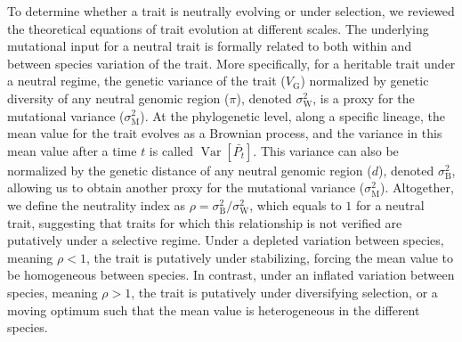 \documentclass{article}
\DeclareMathOperator{\Var}{\text{Var}}
\newcommand{\Time}{t}
\newcommand{\Trait}{P}
\newcommand{\MeanTrait}{\bar{\Trait_{\Time}}}
\newcommand{\VarPhy}{\Var \left[\MeanTrait\right]}
\newcommand{\VarGenetic}{V_{\mathrm{G}}}
\newcommand{\RateMut}{\sigma^2_{\mathrm{M}}}
\newcommand{\RatePhy}{\sigma^2_{\mathrm{B}}}
\newcommand{\RatePop}{\sigma^2_{\mathrm{W}}}
\newcommand{\NI}{\rho}
\begin{document}
To determine whether a trait is neutrally evolving or under selection, we reviewed the theoretical equations of trait evolution at different scales.
The underlying mutational input for a neutral trait is formally related to both within and between species variation of the trait.
More specifically, for a heritable trait under a neutral regime, the genetic variance of the trait ($\VarGenetic$) normalized by genetic diversity of any neutral genomic region ($\pi$), denoted $\RatePop$, is a proxy for the mutational variance ($\RateMut$).
At the phylogenetic level, along a specific lineage, the mean value for the trait evolves as a Brownian process, and the variance in this mean value after a time $\Time$ is called $\VarPhy$.
This variance can also be normalized by the genetic distance of any neutral genomic region ($d$), denoted $\RatePhy$, allowing us to obtain another proxy for the mutational variance ($\RateMut$).
Altogether, we define the neutrality index as $\NI = \RatePhy/\RatePop$, which equals to $1$ for a neutral trait, suggesting that traits for which this relationship is not verified are putatively under a selective regime.
Under a depleted variation between species, meaning $\NI < 1$, the trait is putatively under stabilizing, forcing the mean value to be homogeneous between species.
In contrast, under an inflated variation between species, meaning $\NI > 1$, the trait is putatively under diversifying selection, or a moving optimum such that the mean value is heterogeneous in the different species.
\end{document}
